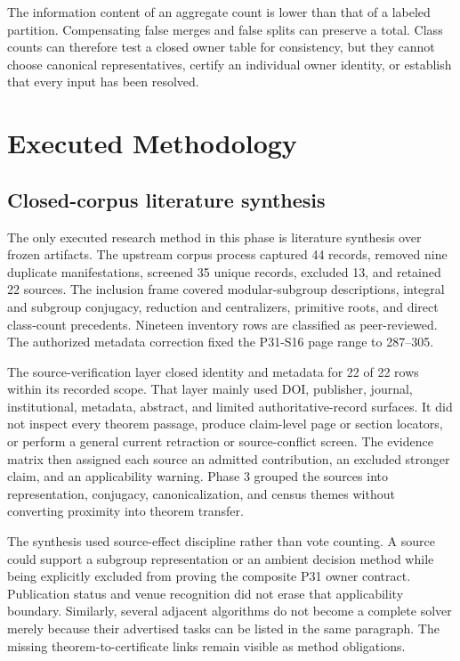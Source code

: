 \documentclass[11pt]{article}
\begin{document}
The information content of an aggregate count is lower than that of a
labeled partition. Compensating false merges and false splits can
preserve a total. Class counts can therefore test a closed owner table
for consistency, but they cannot choose canonical representatives,
certify an individual owner identity, or establish that every input has
been resolved.

\hypertarget{3-executed-methodology}{%
\section{Executed Methodology}\label{3-executed-methodology}}

\hypertarget{31-closed-corpus-literature-synthesis}{%
\subsection{Closed-corpus literature
synthesis}\label{31-closed-corpus-literature-synthesis}}

The only executed research method in this phase is literature synthesis
over frozen artifacts. The upstream corpus process captured 44 records,
removed nine duplicate manifestations, screened 35 unique records,
excluded 13, and retained 22 sources. The inclusion frame covered
modular-subgroup descriptions, integral and subgroup conjugacy,
reduction and centralizers, primitive roots, and direct class-count
precedents. Nineteen inventory rows are classified as peer-reviewed. The
authorized metadata correction fixed the P31-S16 page range to 287--305.

The source-verification layer closed identity and metadata for 22 of 22
rows within its recorded scope. That layer mainly used DOI, publisher,
journal, institutional, metadata, abstract, and limited
authoritative-record surfaces. It did not inspect every theorem passage,
produce claim-level page or section locators, or perform a general
current retraction or source-conflict screen. The evidence matrix then
assigned each source an admitted contribution, an excluded stronger
claim, and an applicability warning. Phase 3 grouped the sources into
representation, conjugacy, canonicalization, and census themes without
converting proximity into theorem transfer.

The synthesis used source-effect discipline rather than vote counting.
A source could support a subgroup representation or an ambient decision
method while being explicitly excluded from proving the composite P31
owner contract. Publication status and venue recognition did not erase
that applicability boundary. Similarly, several adjacent algorithms do
not become a complete solver merely because their advertised tasks can
be listed in the same paragraph. The missing theorem-to-certificate
links remain visible as method obligations.
\end{document}
